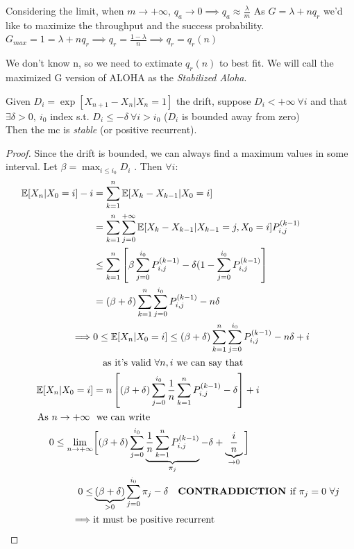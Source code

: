 Considering the limit, when $m \to +\infty$, $q_a \to 0 \implies q_a \approx \frac{\lambda}{m}$
As $G=\lambda + n q_r$ we'd like to maximize the throughput and the success probability.
$G_{max}=1 = \lambda + n  q_r \implies q_r = \frac{1-\lambda}{n} \implies q_r = q_r(n)$

We don't know n, so we need to extimate $q_r(n)$ to best fit. We will call the maximized G version
of ALOHA as the \emph{Stabilized Aloha}.

\begin{lemma}

	Given $D_i = \exp[X_{n+1}-X_n|X_n = 1]$ the drift, suppose $D_i < +\infty ~\forall i$ and that $\exists \delta > 0 , ~i_0$ index s.t.
	$D_i \le - \delta ~\forall i > i_0$ ($D_i$ is bounded away from zero)\\
	Then the \gls{mc} is \emph{stable} (or positive recurrent).

\end{lemma}
\begin{proof}
	Since the drift is bounded, we can always find a maximum values in some interval.
 Let $\beta = \max_{i \le i_0} D_i$ . Then $\forall i$:
 \begin{equation}\begin{split}
	\exp[X_n | X_0 = i] -i &= \sum\limits_{k=1}^n \exp[X_k - X_{k-1}|X_0 = i] \\
	&= \sum\limits_{k=1}^n \sum\limits_{j=0}^{+\infty} \exp[X_k - X_{k-1}|X_{k-1} = j , X_0 = i ] P_{i,j}^{(k-1)}\\
	& \le \sum\limits_{k=1}^{n} \left[\beta \sum\limits_{j=0}^{i_0} P_{i,j}^{(k-1)} - \delta (1- \sum\limits_{j=0}^{i_0} P_{i,j}^{(k-1)}\right]\\
	&= (\beta + \delta) \sum\limits_{k=1}^n \sum\limits_{j=0}^{i_0} P_{i,j}^{(k-1)} - n \delta \\
	\implies & 0 \le \exp[X_n | X_0 = i] \le (\beta + \delta) \sum\limits_{k=1}^n \sum\limits_{j=0}^{i_0} P_{i,j}^{(k-1)} - n \delta +i\\
	& \quad \text{as it's valid $\forall n , i$ we can say that} \\
	\exp[X_n | X_0 = i] &= n \left[(\beta + \delta) \sum\limits_{j=0}^{i_0} \frac{1}{n} \sum\limits_{k=1}^{n} P_{i,j}^{(k-1)} - \delta \right] +i\\
	\text{As $n \to +\infty$ } & \text{ we can write}\\
	0 \le \lim_{n \to +\infty} &\bigg[(\beta + \delta) \sum\limits_{j=0}^{i_0} \underbrace {\frac{1}{n} \sum\limits_{k=1}^{n} P_{i,j}^{(k-1)}}_{\pi_j} - \delta + \underbrace{\frac{i}{n}}_{\to 0}\bigg]\\
	0 \le &\underbrace{(\beta + \delta)}_{>0} \sum\limits_{j=0}^{i_0} \pi_j - \delta \quad \text{\textbf{CONTRADDICTION }if } \pi_j = 0 ~\forall j \\
	\implies & \text{it must be positive recurrent}
	\end{split}\end{equation}
\end{proof}

